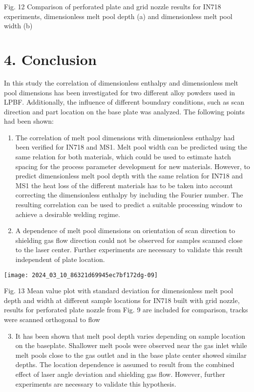 \documentclass[10pt]{article}
\begin{document}
Fig. 12 Comparison of perforated plate and grid nozzle results for IN718 experiments, dimensionless melt pool depth (a) and dimensionless melt pool width (b)

\section*{4. Conclusion}
In this study the correlation of dimensionless enthalpy and dimensionless melt pool dimensions has been investigated for two different alloy powders used in LPBF. Additionally, the influence of different boundary conditions, such as scan direction and part location on the base plate was analyzed. The following points had been shown:

\begin{enumerate}
  \item The correlation of melt pool dimensions with dimensionless enthalpy had been verified for IN718 and MS1. Melt pool width can be predicted using the same relation for both materials, which could be used to estimate hatch spacing for the process parameter development for new materials. However, to predict dimensionless melt pool depth with the same relation for IN718 and MS1 the heat loss of the different materials has to be taken into account correcting the dimensionless enthalpy by including the Fourier number. The resulting correlation can be used to predict a suitable processing window to achieve a desirable welding regime.

  \item A dependence of melt pool dimensions on orientation of scan direction to shielding gas flow direction could not be observed for samples scanned close to the laser center. Further experiments are necessary to validate this result independent of plate location.

\end{enumerate}

\begin{center}
\texttt{[image: 2024\_03\_10\_86321d69945ec7bf172dg-09]}
\end{center}

Fig. 13 Mean value plot with standard deviation for dimensionless melt pool depth and width at different sample locations for IN718 built with grid nozzle, results for perforated plate nozzle from Fig. 9 are included for comparison, tracks were scanned orthogonal to flow

\begin{enumerate}
  \setcounter{enumi}{2}
  \item It has been shown that melt pool depth varies depending on sample location on the baseplate. Shallower melt pools were observed near the gas inlet while melt pools close to the gas outlet and in the base plate center showed similar depths. The location dependence is assumed to result from the combined effect of laser angle deviation and shielding gas flow. However, further experiments are necessary to validate this hypothesis.
\end{enumerate}
\end{document}
